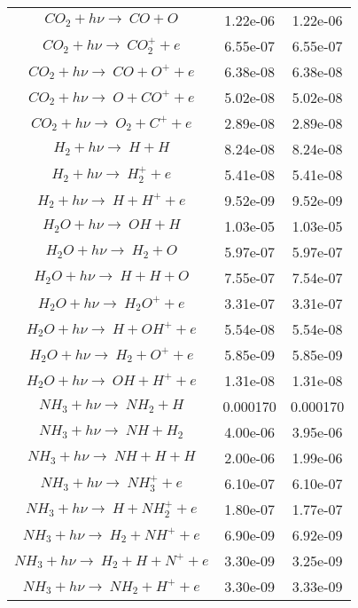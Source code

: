 \documentclass[11pt]{article}
\begin{document}
\begin{tabular}{ccc}
 $CO_2 + h\nu \rightarrow\ CO + O$  &   1.22e-06 &   1.22e-06 \\
 $CO_2 + h\nu \rightarrow\ CO_2^+ + e$  &   6.55e-07 &   6.55e-07 \\
 $CO_2 + h\nu \rightarrow\ CO + O^+ + e$  &   6.38e-08 &   6.38e-08 \\
 $CO_2 + h\nu \rightarrow\ O + CO^+ + e$  &   5.02e-08 &   5.02e-08 \\
 $CO_2 + h\nu \rightarrow\ O_2 + C^+ + e$  &   2.89e-08 &   2.89e-08 \\
 $H_2 + h\nu \rightarrow\ H + H$  &   8.24e-08 &   8.24e-08 \\
 $H_2 + h\nu \rightarrow\ H_2^+ + e$  &   5.41e-08 &   5.41e-08 \\
 $H_2 + h\nu \rightarrow\ H + H^+ + e$  &   9.52e-09 &   9.52e-09 \\
 $H_2O + h\nu \rightarrow\ OH + H$  &   1.03e-05 &   1.03e-05 \\
 $H_2O + h\nu \rightarrow\ H_2 + O$  &   5.97e-07 &   5.97e-07 \\
 $H_2O + h\nu \rightarrow\ H + H + O$  &   7.55e-07 &   7.54e-07 \\
 $H_2O + h\nu \rightarrow\ H_2O^+ + e$  &   3.31e-07 &   3.31e-07 \\
 $H_2O + h\nu \rightarrow\ H + OH^+ + e$  &   5.54e-08 &   5.54e-08 \\
 $H_2O + h\nu \rightarrow\ H_2 + O^+ + e$  &   5.85e-09 &   5.85e-09 \\
 $H_2O + h\nu \rightarrow\ OH + H^+ + e$  &   1.31e-08 &   1.31e-08 \\
 $NH_3 + h\nu \rightarrow\ NH_2 + H$  &   0.000170 &   0.000170 \\
 $NH_3 + h\nu \rightarrow\ NH + H_2$  &   4.00e-06 &   3.95e-06 \\
 $NH_3 + h\nu \rightarrow\ NH + H + H$  &   2.00e-06 &   1.99e-06 \\
 $NH_3 + h\nu \rightarrow\ NH_3^+ + e$  &   6.10e-07 &   6.10e-07 \\
 $NH_3 + h\nu \rightarrow\ H + NH_2^+ + e$  &   1.80e-07 &   1.77e-07 \\
 $NH_3 + h\nu \rightarrow\ H_2 + NH^+ + e$  &   6.90e-09 &   6.92e-09 \\
 $NH_3 + h\nu \rightarrow\ H_2 + H + N^+ + e$  &   3.30e-09 &   3.25e-09 \\
 $NH_3 + h\nu \rightarrow\ NH_2 + H^+ + e$  &   3.30e-09 &   3.33e-09 \\
\end{tabular}
\end{document}
